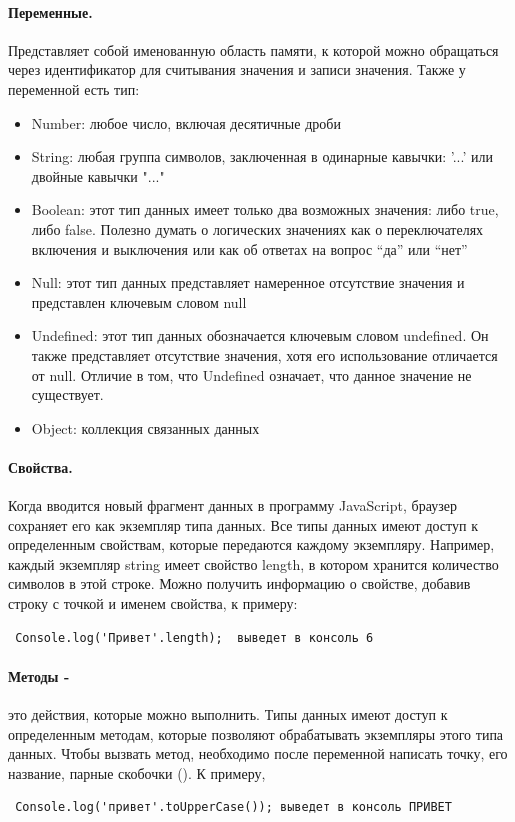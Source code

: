 \documentclass[14pt,Diplom]{diplomwork}
\begin{document}
\paragraph{Переменные.}
Представляет собой именованную область памяти, к которой можно обращаться через идентификатор для считывания значения
и записи значения. Также у переменной есть тип: 
 \begin{itemize}
	\item Number: любое число, включая десятичные дроби
	\item String: любая группа символов, заключенная в одинарные кавычки: '...' или двойные кавычки "..."
	\item Boolean: этот тип данных имеет только два возможных значения: либо true, либо false. Полезно думать о логических значениях как о переключателях включения и выключения или как об ответах на вопрос “да” или “нет”
	\item Null: этот тип данных представляет намеренное отсутствие значения и представлен ключевым словом null
	\item Undefined: этот тип данных обозначается ключевым словом undefined. Он также представляет отсутствие значения, хотя его использование отличается от null. Отличие в том, что Undefined означает, что данное значение не существует.
	\item Object: коллекция связанных данных
\end{itemize}

\paragraph{Свойства.}
 Когда вводится новый фрагмент данных в программу JavaScript, браузер сохраняет его как экземпляр типа данных. Все типы данных имеют доступ к определенным свойствам, которые передаются каждому экземпляру. Например, каждый экземпляр string имеет свойство length, в котором хранится количество символов в этой строке. Можно получить информацию о свойстве, добавив строку с точкой и именем свойства, к примеру: 
 \begin{verbatim} Console.log('Привет'.length);  выведет в консоль 6 \end{verbatim} 

\paragraph{Методы -}
это действия, которые можно выполнить. Типы данных имеют доступ к определенным методам, которые позволяют обрабатывать экземпляры этого типа данных. Чтобы вызвать метод, необходимо после переменной написать точку, его название, парные скобочки (). К примеру, 
\begin{verbatim} Сonsole.log('привет'.toUpperCase()); выведет в консоль ПРИВЕТ \end{verbatim} 
\end{document}
